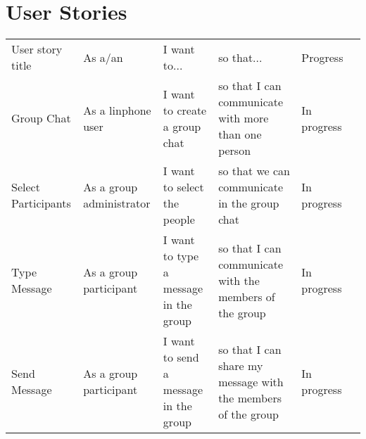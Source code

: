\documentclass[a4paper]{article}
\begin{document}
\newpage

\section{User Stories}
\setlength{\arrayrulewidth}{0.5mm}
\setlength{\tabcolsep}{12pt}
\renewcommand{\arraystretch}{2} 
\begin{tabular}{ |p{2.5cm}|p{2.5cm}|p{2.5cm} |p{2.5cm}|p{2.5cm}|p{2.5cm}| }
\hline
\rowcolor{lightgray}\multicolumn{5}{|c|}{User Stories} \\
\hline
User story title & As a/an & I want to... & so that... & Progress \\
\hline 
Group Chat & As a linphone user & I want to create a group chat & so that I can communicate with more than one person & In progress \\ 
\hline
Select Participants & As a group administrator & I want to select the people  & so that we can communicate in the group chat & In progress \\ 
\hline
Type Message & As a group participant & I want to type a message in the group & so that I can communicate with the members of the group & In progress \\ 
\hline
Send Message & As a group participant & I want to send a message in the group & so that I can share my message with the members of the group & In progress \\ 
\hline

\end{tabular}
\end{document}
